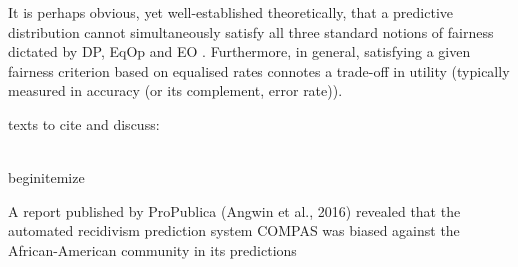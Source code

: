 It is perhaps obvious, yet well-established theoretically, that a predictive distribution cannot
simultaneously satisfy all three standard notions of fairness dictated by DP, EqOp and EO
\cite{kleinberg2016inherent}.
Furthermore, in general, satisfying a given fairness criterion based on equalised rates connotes a
trade-off in utility (typically measured in accuracy (or its complement, error rate)).


 texts to cite and discuss: \cite{saravanakumar2020impossibility, zhao2022inherent,
 kallus2018residual, kkku}


 \\begin{itemize}
          \item A report published by ProPublica (Angwin et al., 2016) revealed that the automated
              recidivism prediction system COMPAS was biased against the African-American community
              in its predictions 

